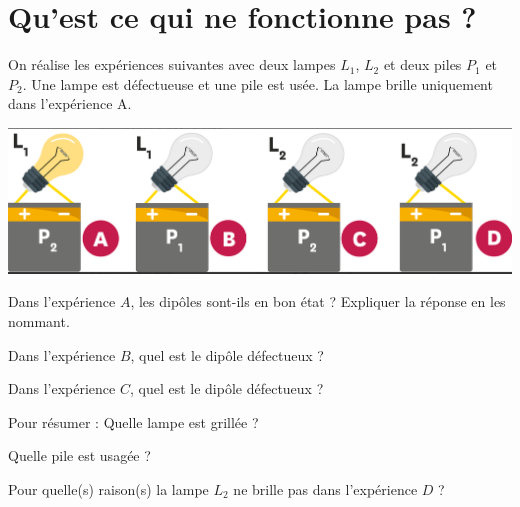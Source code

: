 \section{Qu'est ce qui ne fonctionne pas ?}

On réalise les expériences suivantes avec deux lampes $L_1$, $L_2$ et deux piles $P_1$ et $P_2$. Une lampe est défectueuse et une pile est usée. La lampe brille uniquement dans l'expérience A.

\begin{center}
	\includegraphics[scale=0.3]{img/lampes_piles}
\end{center}

\begin{questions}
	\question Dans l'expérience $A$, les dipôles sont-ils en bon état ? Expliquer la réponse en les nommant.
	
	\question Dans l'expérience $B$, quel est le dipôle défectueux ?
	
	\question Dans l'expérience $C$, quel est le dipôle défectueux ?
	
	Pour résumer :
	\question Quelle lampe est grillée ?
	
	\question Quelle pile est usagée ?
	
	\question Pour quelle(s) raison(s) la lampe $L_2$ ne brille pas dans l'expérience $D$ ?
	\end{questions}

